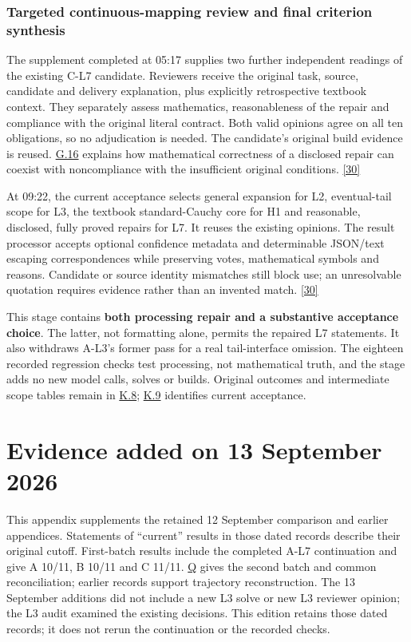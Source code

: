 \subsubsection[Targeted continuous-mapping review and final criterion synthesis]{\texorpdfstring{\protect\hypertarget{n6-4}{}Targeted continuous-mapping review and final criterion synthesis}{Targeted continuous-mapping review and final criterion synthesis}}
The supplement completed at 05:17 supplies two further independent readings of the existing C-L7 candidate. Reviewers receive the original task, source, candidate and delivery explanation, plus explicitly retrospective textbook context. They separately assess mathematics, reasonableness of the repair and compliance with the original literal contract. Both valid opinions agree on all ten obligations, so no adjudication is needed. The candidate's original build evidence is reused. \hyperlink{g16}{G.16} explains how mathematical correctness of a disclosed repair can coexist with noncompliance with the insufficient original conditions. \href{en.pdf\#ref-30}{\mbox{[30]}}

At 09:22, the current acceptance selects general expansion for L2, eventual-tail scope for L3, the textbook standard-Cauchy core for H1 and reasonable, disclosed, fully proved repairs for L7. It reuses the existing opinions. The result processor accepts optional confidence metadata and determinable JSON/text escaping correspondences while preserving votes, mathematical symbols and reasons. Candidate or source identity mismatches still block use; an unresolvable quotation requires evidence rather than an invented match. \href{en.pdf\#ref-30}{\mbox{[30]}}

This stage contains \textbf{both processing repair and a substantive acceptance choice}. The latter, not formatting alone, permits the repaired L7 statements. It also withdraws A-L3's former pass for a real tail-interface omission. The eighteen recorded regression checks test processing, not mathematical truth, and the stage adds no new model calls, solves or builds. Original outcomes and intermediate scope tables remain in \hyperlink{k8}{K.8}; \hyperlink{k9}{K.9} identifies current acceptance.

\section[Evidence added on 13 September 2026]{\texorpdfstring{\protect\hypertarget{appendix-o}{}Evidence added on 13 September 2026}{Evidence added on 13 September 2026}}
This appendix supplements the retained 12 September comparison and earlier appendices. Statements of “current” results in those dated records describe their original cutoff. First-batch results include the completed A-L7 continuation and give A 10/11, B 10/11 and C 11/11. \hyperlink{appendix-q}{Q} gives the second batch and common reconciliation; earlier records support trajectory reconstruction. The 13 September additions did not include a new L3 solve or new L3 reviewer opinion; the L3 audit examined the existing decisions. This edition retains those dated records; it does not rerun the continuation or the recorded checks.

